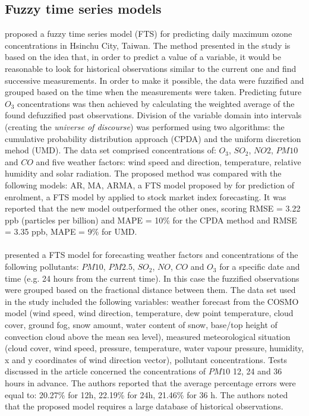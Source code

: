 \subsection{Fuzzy time series models}
\cite{CHENG20112016} proposed a fuzzy time series model (FTS) for predicting daily maximum ozone concentrations in Hsinchu City, Taiwan. The method presented in the study is based on the idea that, in order to predict a value of a variable, it would be reasonable to look for historical observations similar to the current one and find successive measurements. In order to make it possible, the data were fuzzified and grouped based on the time when the measurements were taken. Predicting future $O_3$ concentrations was then achieved by calculating the weighted average of the found defuzzified past observations. Division of the variable domain into intervals (creating the \textit{universe of discourse}) was performed using two algorithms: the cumulative probability distribution approach (CPDA) and the uniform discretion mehod (UMD). 
The data set comprised concentrations of: $O_3$, $SO_2$, $NO2$, $PM10$ and $CO$ and five weather factors: wind speed and direction, temperature, relative humidity and solar radiation. The proposed method was compared with the following models: AR, MA, ARMA, a FTS model proposed by \cite{CHEN1996311} for prediction of enrolment, a FTS model by \cite{YU2005609} applied to stock market index forecasting. It was reported that the new model outperformed the other ones, scoring RMSE = 3.22 ppb (particles per billion) and MAPE = 10\% for the CPDA method and RMSE = 3.35 ppb, MAPE = 9\% for UMD.
\\\\
\cite{DOMANSKA20127673} presented a FTS model for forecasting weather factors and concentrations of the following pollutants: $PM10$, $PM2.5$, $SO_2$, $NO$, $CO$ and $O_3$ for a specific date and time (e.g. 24 hours from the current time). In this case the fuzzified observations were grouped based on the fractional distance between them. The data set used in the study included the following variables: weather forecast from the COSMO model (wind speed, wind direction, temperature, dew point temperature, cloud cover, ground fog, snow amount, water content of snow, base/top height of convection cloud above the mean sea level),  measured meteorological situation (cloud cover, wind speed, pressure, temperature, water vapour pressure, humidity, x and y coordinates of wind direction vector), pollutant concentrations. Tests discussed in the article concerned the concentrations of $PM10$ 12, 24 and 36 hours in advance. The authors reported that the average percentage errors were equal to: 20.27\% for 12h, 22.19\% for 24h, 21.46\% for 36 h. The authors noted that the proposed model requires a large database of historical observations.
